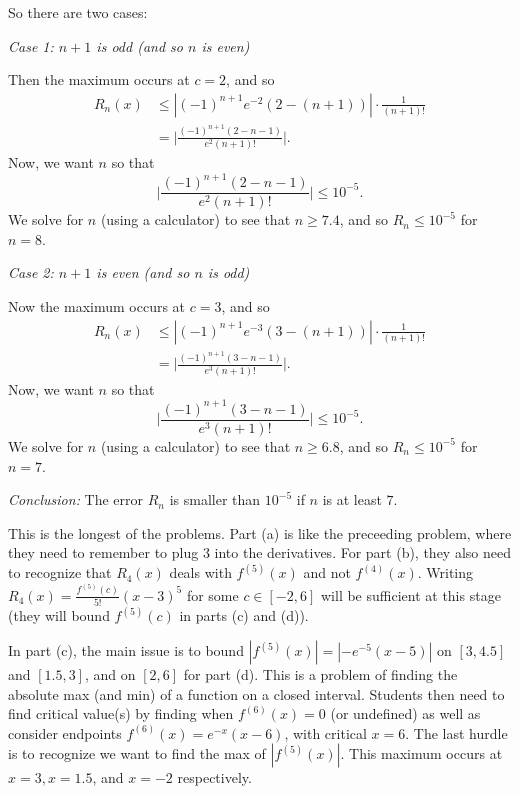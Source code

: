 \documentclass[handout]{ximera}
\begin{document}
\begin{problem}
\begin{freeResponse}
\begin{enumerate}
	So there are two cases:
	
	\vskip 10pt
	
	{\it Case 1:  $n+1$ is odd (and so $n$ is even)}
	
	Then the maximum occurs at $c=2$, and so
		\begin{align*}
		R_n(x) &\leq | (-1)^{n+1} e^{-2} (2 - (n+1)) | \cdot \frac{1}{(n+1)!}  \\
		&= \biggr| \frac{(-1)^{n+1} (2-n-1)}{e^2 (n+1)!} \biggr| .
		\end{align*}
	Now, we want $n$ so that 
		\[
		\biggr| \frac{(-1)^{n+1} (2-n-1)}{e^2 (n+1)!} \biggr| \leq 10^{-5}.
		\]
	We solve for $n$ (using a calculator) to see that $n \geq 7.4$, and so $R_n \leq 10^{-5}$ for $n = 8$.
	
	\vskip 10pt
	
	{\it Case 2:  $n+1$ is even (and so $n$ is odd)}
	
	Now the maximum occurs at $c=3$, and so
		\begin{align*}
		R_n(x) &\leq | (-1)^{n+1} e^{-3} (3 - (n+1)) | \cdot \frac{1}{(n+1)!}  \\
		&= \biggr| \frac{(-1)^{n+1} (3-n-1)}{e^3 (n+1)!} \biggr| .
		\end{align*}
	Now, we want $n$ so that 
		\[
		\biggr| \frac{(-1)^{n+1} (3-n-1)}{e^3 (n+1)!} \biggr| \leq 10^{-5}.
		\]
	We solve for $n$ (using a calculator) to see that $n \geq 6.8$, and so $R_n \leq 10^{-5}$ for $n = 7$.
	
	\vskip 10pt
	
	{\it Conclusion:} The error $R_n$ is smaller than $10^{-5}$ if $n$ is at least $7$.
	
	
	
	\end{enumerate}
	\end{freeResponse}

\end{problem}

\begin{instructorNotes}
This is the longest of the problems.  
Part (a) is like the preceeding problem, where they need to remember to plug $3$ into the derivatives.  
For part (b), they also need to recognize that $R_4(x)$ deals with $f^{(5)}(x)$ and not $f^{(4)}(x)$.  
Writing $R_4(x) = \frac{f^{(5)}(c)}{5!} (x-3)^5$ for some $c \in [-2,6]$ will be sufficient at this stage (they will bound $f^{(5)}(c)$ in parts (c) and (d)).  

In part (c), the main issue is to bound $|f^{(5)}(x)| = |-e^{-5}(x-5)|$ on $[3,4.5]$ and $[1.5,3]$, and on $[2,6]$ for part (d).  
This is a problem of finding the absolute max (and min) of a function on a closed interval.  
Students then need to find critical value(s) by finding when $f^{(6)}(x) = 0$ (or undefined) as well as consider endpoints $f^{(6)}(x) = e^{-x}(x-6)$, with critical $x=6$.  
The last hurdle is to recognize we want to find the max of $|f^{(5)}(x)|$.  
This maximum occurs at $x=3, x=1.5$, and $x=-2$ respectively.
\end{instructorNotes}
\end{document}
